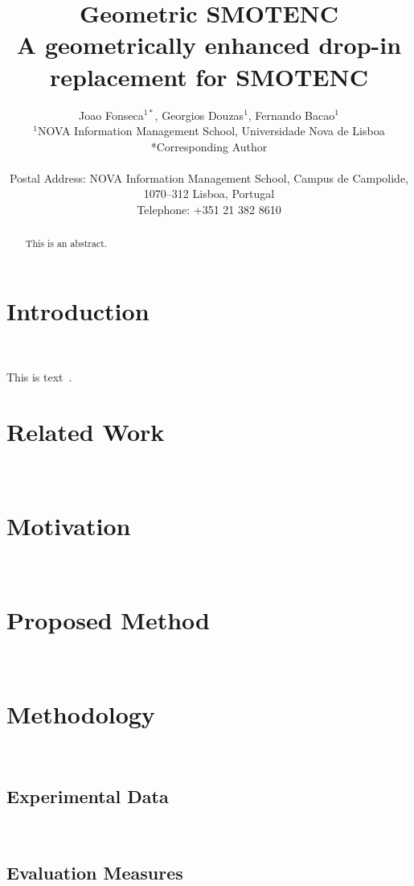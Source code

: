 \documentclass[parskip=full]{scrartcl}
\title{Geometric SMOTENC \\ \LARGE{A geometrically enhanced drop-in
replacement for SMOTENC}}
\author{%
	Joao Fonseca\(^{1*}\), Georgios Douzas\(^{1}\), Fernando Bacao\(^{1}\)
	\\
	\small{\(^{1}\)NOVA Information Management School, Universidade Nova de Lisboa}
	\\
	\small{*Corresponding Author}
	\\
	\\
	\small{Postal Address: NOVA Information Management School, Campus de
    Campolide, 1070--312 Lisboa, Portugal}
	\\
	\small{Telephone: +351 21 382 8610}
}
\date{}
\begin{document}
\maketitle

\begin{abstract}
    This is an abstract.
\end{abstract}

\section{Introduction}~\label{sec:introduction}

This is text~\cite{Chawla2002}.


\section{Related Work}~\label{sec:related_work}

\section{Motivation}~\label{sec:motivation}

\section{Proposed Method}~\label{sec:proposed_method}

\section{Methodology}~\label{sec:methodology}

\subsection{Experimental Data}~\label{sec:experimental_data}



\subsection{Evaluation Measures}~\label{sec:evaluation_measures}
\end{document}
